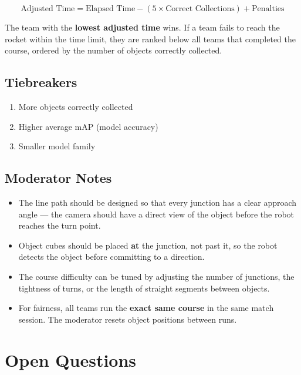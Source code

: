 \documentclass[11pt,a4paper]{article}
\begin{document}
\begin{equation}
    \text{Adjusted Time} = \text{Elapsed Time} - (5 \times \text{Correct Collections}) + \text{Penalties}
\end{equation}

The team with the \textbf{lowest adjusted time} wins. If a team fails to reach the rocket within the time limit, they are ranked below all teams that completed the course, ordered by the number of objects correctly collected.

\subsection{Tiebreakers}

\begin{enumerate}
    \item More objects correctly collected
    \item Higher average mAP (model accuracy)
    \item Smaller model family
\end{enumerate}

\subsection{Moderator Notes}

\begin{itemize}
    \item The line path should be designed so that every junction has a clear approach angle — the camera should have a direct view of the object before the robot reaches the turn point.
    \item Object cubes should be placed \textbf{at} the junction, not past it, so the robot detects the object before committing to a direction.
    \item The course difficulty can be tuned by adjusting the number of junctions, the tightness of turns, or the length of straight segments between objects.
    \item For fairness, all teams run the \textbf{exact same course} in the same match session. The moderator resets object positions between runs.
\end{itemize}

\section{Open Questions}
\end{document}
